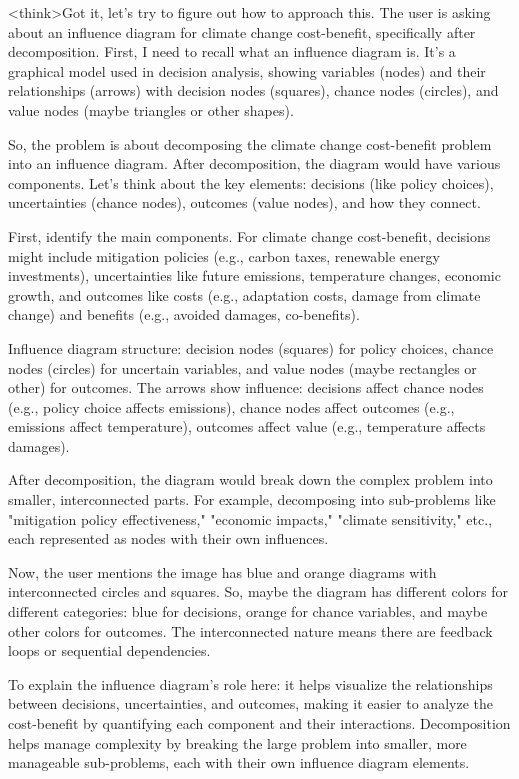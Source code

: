 <think>Got it, let's try to figure out how to approach this. The user is asking about an influence diagram for climate change cost-benefit, specifically after decomposition. First, I need to recall what an influence diagram is. It's a graphical model used in decision analysis, showing variables (nodes) and their relationships (arrows) with decision nodes (squares), chance nodes (circles), and value nodes (maybe triangles or other shapes). 

So, the problem is about decomposing the climate change cost-benefit problem into an influence diagram. After decomposition, the diagram would have various components. Let's think about the key elements: decisions (like policy choices), uncertainties (chance nodes), outcomes (value nodes), and how they connect. 

First, identify the main components. For climate change cost-benefit, decisions might include mitigation policies (e.g., carbon taxes, renewable energy investments), uncertainties like future emissions, temperature changes, economic growth, and outcomes like costs (e.g., adaptation costs, damage from climate change) and benefits (e.g., avoided damages, co-benefits). 

Influence diagram structure: decision nodes (squares) for policy choices, chance nodes (circles) for uncertain variables, and value nodes (maybe rectangles or other) for outcomes. The arrows show influence: decisions affect chance nodes (e.g., policy choice affects emissions), chance nodes affect outcomes (e.g., emissions affect temperature), outcomes affect value (e.g., temperature affects damages). 

After decomposition, the diagram would break down the complex problem into smaller, interconnected parts. For example, decomposing into sub-problems like "mitigation policy effectiveness," "economic impacts," "climate sensitivity," etc., each represented as nodes with their own influences. 

Now, the user mentions the image has blue and orange diagrams with interconnected circles and squares. So, maybe the diagram has different colors for different categories: blue for decisions, orange for chance variables, and maybe other colors for outcomes. The interconnected nature means there are feedback loops or sequential dependencies. 

To explain the influence diagram's role here: it helps visualize the relationships between decisions, uncertainties, and outcomes, making it easier to analyze the cost-benefit by quantifying each component and their interactions. Decomposition helps manage complexity by breaking the large problem into smaller, more manageable sub-problems, each with their own influence diagram elements. 

